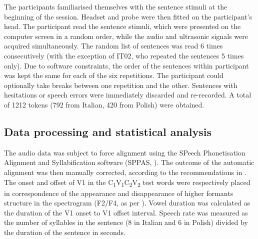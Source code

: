 \documentclass[preprint]{JASAnew}
\begin{document}
The participants familiarised themselves with the sentence stimuli at
the beginning of the session. Headset and probe were then fitted on the
participant's head. The participant read the sentence stimuli, which
were presented on the computer screen in a random order, while the audio
and ultrasonic signals were acquired simultaneously. The random list of
sentences was read 6 times consecutively (with the exception of IT02,
who repeated the sentences 5 times only). Due to software constraints,
the order of the sentences within participant was kept the same for each
of the six repetitions. The participant could optionally take breaks
between one repetition and the other. Sentences with hesitations or
speech errors were immediately discarded and re-recorded. A total of
1212 tokens (792 from Italian, 420 from Polish) were obtained.

\hypertarget{data-processing-and-statistical-analysis}{%
\subsection{Data processing and statistical
analysis}\label{data-processing-and-statistical-analysis}}

\label{s:process}

The audio data was subject to force alignment using the SPeech
Phonetisation Alignment and Syllabification software (SPPAS,
\citealt{bigi2015}). The outcome of the automatic alignment was then
manually corrected, according to the recommendations in
\citet{machac2009}. The onset and offset of V1 in the
C\textsubscript{1}V\textsubscript{1}C\textsubscript{2}V\textsubscript{2}
test words were respectively placed in correspondence of the appearance
and disappearance of higher formants structure in the spectrogram
(F2/F4, as per \citealt{machac2009}). Vowel duration was calculated as
the duration of the V1 onset to V1 offset interval. Speech rate was
measured as the number of syllables in the sentence (8 in Italian and 6
in Polish) divided by the duration of the sentence in seconds.
\end{document}
